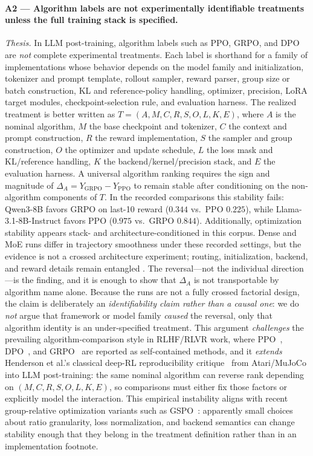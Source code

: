 \documentclass[12pt,a4paper]{report}
\begin{document}
\paragraph{A2 --- Algorithm labels are not experimentally identifiable treatments unless the full training stack is specified.}
\emph{Thesis.} In LLM post-training, algorithm labels such as PPO, GRPO, and DPO are \emph{not} complete experimental treatments. Each label is shorthand for a family of implementations whose behavior depends on the model family and initialization, tokenizer and prompt template, rollout sampler, reward parser, group size or batch construction, KL and reference-policy handling, optimizer, precision, LoRA target modules, checkpoint-selection rule, and evaluation harness. The realized treatment is better written as $T=(A,M,C,R,S,O,L,K,E)$, where $A$ is the nominal algorithm, $M$ the base checkpoint and tokenizer, $C$ the context and prompt construction, $R$ the reward implementation, $S$ the sampler and group construction, $O$ the optimizer and update schedule, $L$ the loss mask and KL/reference handling, $K$ the backend/kernel/precision stack, and $E$ the evaluation harness. A universal algorithm ranking requires the sign and magnitude of $\Delta_A = Y_{\text{GRPO}} - Y_{\text{PPO}}$ to remain stable after conditioning on the non-algorithm components of $T$. In the recorded comparisons this stability fails: Qwen3-8B favors GRPO on last-10 reward ($0.344$ vs.\ PPO $0.225$), while Llama-3.1-8B-Instruct favors PPO ($0.975$ vs.\ GRPO $0.844$). 
Additionally, optimization stability appears stack- and architecture-conditioned in this corpus. Dense and MoE runs differ in trajectory smoothness under these recorded settings, but the evidence is not a crossed architecture experiment; routing, initialization, backend, and reward details remain entangled \citep{deepseek2025r1, zheng2025gspo}.
The reversal---not the individual direction---is the finding, and it is enough to show that $\Delta_A$ is not transportable by algorithm name alone. Because the runs are not a fully crossed factorial design, the claim is deliberately an \emph{identifiability claim rather than a causal one}: we do \emph{not} argue that framework or model family \emph{caused} the reversal, only that algorithm identity is an under-specified treatment. This argument \emph{challenges} the prevailing algorithm-comparison style in RLHF/RLVR work, where PPO~\citep{schulman2017ppo}, DPO~\citep{rafailov2023dpo}, and GRPO~\citep{shao2024deepseekmath} are reported as self-contained methods, and it \emph{extends} Henderson et al.'s classical deep-RL reproducibility critique~\citep{henderson2018deep} from Atari/MuJoCo into LLM post-training: the same nominal algorithm can reverse rank depending on $(M,C,R,S,O,L,K,E)$, so comparisons must either fix those factors or explicitly model the interaction.
This empirical instability aligns with recent group-relative optimization variants such as GSPO~\citep{zheng2025gspo}: apparently small choices about ratio granularity, loss normalization, and backend semantics can change stability enough that they belong in the treatment definition rather than in an implementation footnote.
\end{document}
